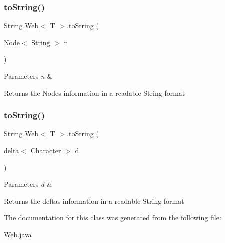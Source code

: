 \subsubsection{\texorpdfstring{toString()}{toString()}\hspace{0.1cm}{\footnotesize\ttfamily [1/2]}}
{\footnotesize\ttfamily String \mbox{\hyperlink{class_web}{Web}}$<$ T $>$.to\+String (\begin{DoxyParamCaption}\item[{Node$<$ String $>$}]{n }\end{DoxyParamCaption})\hspace{0.3cm}{\ttfamily [inline]}}


\begin{DoxyParams}{Parameters}
{\em n} & \\
\hline
\end{DoxyParams}
\begin{DoxyReturn}{Returns}
the Node\textquotesingle{}s information in a readable String format 
\end{DoxyReturn}
\mbox{\label{class_web_adedf3de84f0f3c9350af5b54219b69ee}} 
\subsubsection{\texorpdfstring{toString()}{toString()}\hspace{0.1cm}{\footnotesize\ttfamily [2/2]}}
{\footnotesize\ttfamily String \mbox{\hyperlink{class_web}{Web}}$<$ T $>$.to\+String (\begin{DoxyParamCaption}\item[{delta$<$ Character $>$}]{d }\end{DoxyParamCaption})\hspace{0.3cm}{\ttfamily [inline]}}


\begin{DoxyParams}{Parameters}
{\em d} & \\
\hline
\end{DoxyParams}
\begin{DoxyReturn}{Returns}
the delta\textquotesingle{}s information in a readable String format 
\end{DoxyReturn}


The documentation for this class was generated from the following file\+:\begin{DoxyCompactItemize}
\item 
Web.\+java\end{DoxyCompactItemize}
